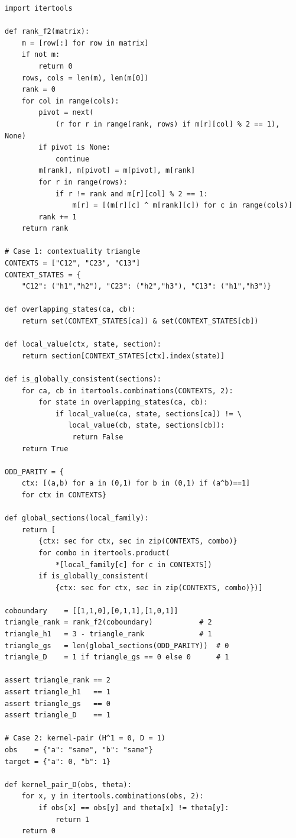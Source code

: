 \documentclass[11pt]{article}
\begin{document}
\begin{lstlisting}
import itertools

def rank_f2(matrix):
    m = [row[:] for row in matrix]
    if not m:
        return 0
    rows, cols = len(m), len(m[0])
    rank = 0
    for col in range(cols):
        pivot = next(
            (r for r in range(rank, rows) if m[r][col] % 2 == 1), None)
        if pivot is None:
            continue
        m[rank], m[pivot] = m[pivot], m[rank]
        for r in range(rows):
            if r != rank and m[r][col] % 2 == 1:
                m[r] = [(m[r][c] ^ m[rank][c]) for c in range(cols)]
        rank += 1
    return rank

# Case 1: contextuality triangle
CONTEXTS = ["C12", "C23", "C13"]
CONTEXT_STATES = {
    "C12": ("h1","h2"), "C23": ("h2","h3"), "C13": ("h1","h3")}

def overlapping_states(ca, cb):
    return set(CONTEXT_STATES[ca]) & set(CONTEXT_STATES[cb])

def local_value(ctx, state, section):
    return section[CONTEXT_STATES[ctx].index(state)]

def is_globally_consistent(sections):
    for ca, cb in itertools.combinations(CONTEXTS, 2):
        for state in overlapping_states(ca, cb):
            if local_value(ca, state, sections[ca]) != \
               local_value(cb, state, sections[cb]):
                return False
    return True

ODD_PARITY = {
    ctx: [(a,b) for a in (0,1) for b in (0,1) if (a^b)==1]
    for ctx in CONTEXTS}

def global_sections(local_family):
    return [
        {ctx: sec for ctx, sec in zip(CONTEXTS, combo)}
        for combo in itertools.product(
            *[local_family[c] for c in CONTEXTS])
        if is_globally_consistent(
            {ctx: sec for ctx, sec in zip(CONTEXTS, combo)})]

coboundary    = [[1,1,0],[0,1,1],[1,0,1]]
triangle_rank = rank_f2(coboundary)           # 2
triangle_h1   = 3 - triangle_rank             # 1
triangle_gs   = len(global_sections(ODD_PARITY))  # 0
triangle_D    = 1 if triangle_gs == 0 else 0      # 1

assert triangle_rank == 2
assert triangle_h1   == 1
assert triangle_gs   == 0
assert triangle_D    == 1

# Case 2: kernel-pair (H^1 = 0, D = 1)
obs    = {"a": "same", "b": "same"}
target = {"a": 0, "b": 1}

def kernel_pair_D(obs, theta):
    for x, y in itertools.combinations(obs, 2):
        if obs[x] == obs[y] and theta[x] != theta[y]:
            return 1
    return 0


\end{lstlisting}
\end{document}
